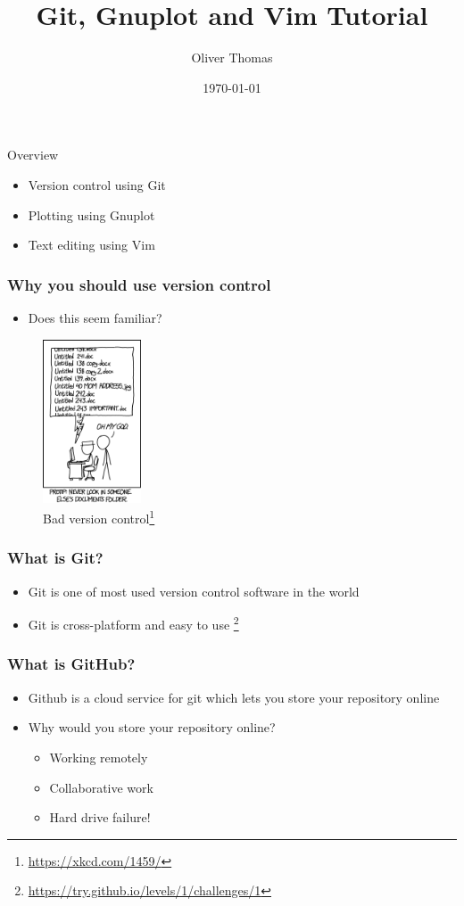 \documentclass{beamer}
\title{Git, Gnuplot and Vim Tutorial}
\author{Oliver Thomas}
\institute{Quantum Engineering CDT \\ University of Bristol}
\date{\today}
\begin{document}
\frame{\titlepage}



\begin{frame}{Overview}


\begin{itemize}
        \item Version control using Git
        \item Plotting using Gnuplot
        \item Text editing using Vim
    \end{itemize}
\end{frame}

\begin{frame}
\frametitle{Why you should use version control}
\begin{itemize}
	\item Does this seem familiar? 
\end{itemize}

\begin{figure}[H]
	\centering
	\includegraphics[width=0.26\textwidth]{xkcdversion.png}
	\caption{Bad version control\footnote{\url{https://xkcd.com/1459/}}}
	\label{fig:xkcdversion}
\end{figure}
\end{frame}

\begin{frame}
\frametitle{What is Git?}
\begin{itemize}
\item Git is one of most used version control software in the world 
\item Git is cross-platform and easy to use \footnote{\url{https://try.github.io/levels/1/challenges/1}}
\end{itemize}
\end{frame}

\begin{frame}
\frametitle{What is GitHub?}
\begin{itemize} 
\item Github is a cloud service for git which lets you store your repository online
\item Why would you store your repository online?
\begin{itemize}
\item Working remotely
\item Collaborative work  
\item Hard drive failure!
\end{itemize}
\end{itemize}
\end{frame}
\end{document}
